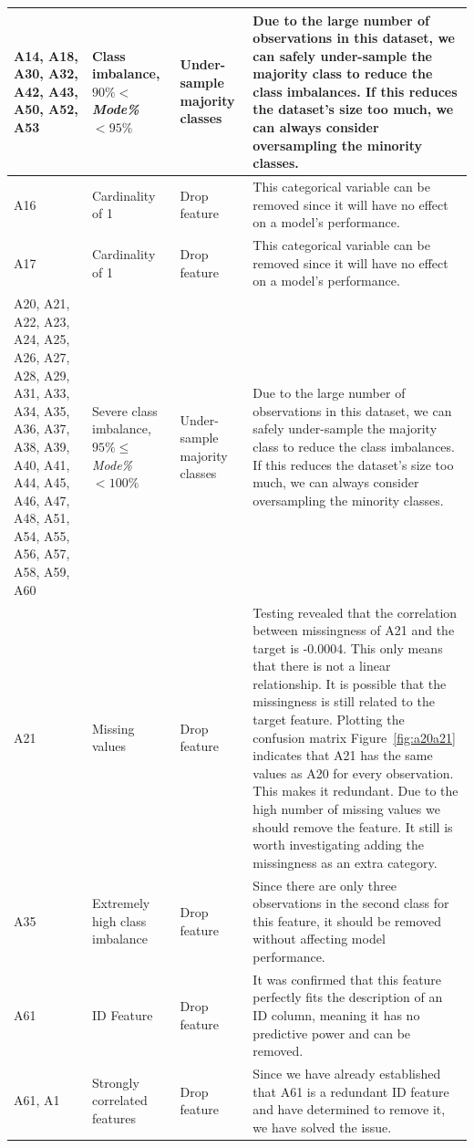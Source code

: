 \documentclass[11pt]{article}
\begin{document}
\begin{longtable}{|p{1.7cm}|p{4cm}|p{3cm}|p{6cm}|}
	A14, A18, A30, A32, A42, A43, A50, A52, A53 & Class imbalance, $90\%<$\textit{Mode\%} $< 95\%$ & Under-sample majority classes & Due to the large number of observations in this dataset, we can safely under-sample the majority class to reduce the class imbalances. If this reduces the dataset's size too much, we can always consider oversampling the minority classes. \\ \hline
	A16 & Cardinality of 1 & Drop feature & This categorical variable can be removed since it will have no effect on a model's performance. \\ \hline
	A17 & Cardinality of 1 & Drop feature & This categorical variable can be removed since it will have no effect on a model's performance. \\ \hline
	A20, A21, A22, A23, A24, A25, A26, A27, A28, A29, A31, A33, A34, A35, A36, A37, A38, A39, A40, A41, A44, A45, A46, A47, A48, A51, A54, A55, A56, A57, A58, A59, A60 & Severe class imbalance, $95\%\le$\textit{Mode\%} $< 100\%$ & Under-sample majority classes & Due to the large number of observations in this dataset, we can safely under-sample the majority class to reduce the class imbalances. If this reduces the dataset's size too much, we can always consider oversampling the minority classes. \\ \hline
	A21 & Missing values & Drop feature & Testing revealed that the correlation between missingness of A21 and the target is -0.0004. This only means that there is not a linear relationship. It is possible that the missingness is still related to the target feature. Plotting the confusion matrix Figure~\ref{fig:a20a21} indicates that A21 has the same values as A20 for every observation. This makes it redundant. Due to the high number of missing values we should remove the feature. It still is worth investigating adding the missingness as an extra category. \\ \hline
	A35 & Extremely high class imbalance & Drop feature & Since there are only three observations in the second class for this feature, it should be removed without affecting model performance. \\ \hline
	A61 & ID Feature & Drop feature & It was confirmed that this feature perfectly fits the description of an ID column, meaning it has no predictive power and can be removed. \\ \hline
	A61, A1 & Strongly correlated features & Drop feature & Since we have already established that A61 is a redundant ID feature and have determined to remove it, we have solved the issue. \\ \hline

\end{longtable}
\end{document}
